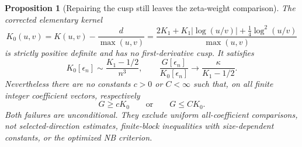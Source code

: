 \documentclass[11pt]{article}
\newtheorem{proposition}[theorem]{Proposition}
\theoremstyle{remark}
\begin{document}
\begin{proposition}[Repairing the cusp still leaves the zeta-weight comparison]
\label{prop:ns70-repaired-background}
The corrected elementary kernel
\begin{equation}
 K_0(u,v)=K(u,v)-\frac d{\max(u,v)}
 =\frac{2K_1+K_1|\log(u/v)|+\tfrac14\log^2(u/v)}{\max(u,v)}
 \label{eq:ns70-repair}
\end{equation}
is strictly positive definite and has no first-derivative cusp.
It satisfies
\[
 K_0[\epsilon_n]\sim\frac{K_1-1/2}{n^3},\qquad
 \frac{G[\epsilon_n]}{K_0[\epsilon_n]}
                \longrightarrow\frac\kappa{K_1-1/2}.
\]
Nevertheless there are no constants $c>0$ or $C<\infty$ such that,
on all finite integer coefficient vectors, respectively
\[
 G\geq cK_0\qquad\text{or}\qquad G\leq CK_0.
\]
Both failures are unconditional. They exclude uniform all-coefficient
comparisons, not selected-direction estimates, finite-block inequalities
with size-dependent constants, or the optimized NB criterion.
\end{proposition}
\end{document}
